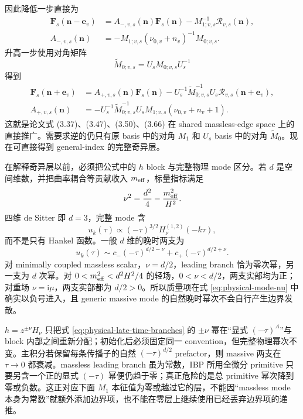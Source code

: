 \documentclass[11pt,a4paper]{ctexart}
\newcommand{\ii}{\mathrm i}
\newcommand{\cR}{\mathcal R}
\begin{document}
因此降低一步直接为
\begin{align}
 \bm F_s(\bm n-\bm e_v)
 &=A_{-,v,s}(\bm n)\bm F_s(\bm n)
 -M_{1;v,s}^{-1}\cR_{v,s}(\bm n),\\
 A_{-,v,s}(\bm n)
 &=-M_{1;v,s}(\nu_{0,v}+n_v)^{-1}M_{0;v,s}.
 \label{eq:global-Aminus}
\end{align}
升高一步使用对角矩阵
\begin{equation}
 \widetilde M_{0;v,s}=U_sM_{0;v,s}U_s^{-1}
\end{equation}
得到
\begin{align}
 \bm F_s(\bm n+\bm e_v)
 &=A_{+,v,s}(\bm n)\bm F_s(\bm n)
 -U_s^{-1}\widetilde M_{0;v,s}^{-1}U_s
 \cR_{v,s}(\bm n+\bm e_v),\\
 A_{+,v,s}(\bm n)
 &=-U_s^{-1}\widetilde M_{0;v,s}^{-1}U_s
 M_{1;v,s}(\nu_{0,v}+n_v+1).
 \label{eq:global-Aplus}
\end{align}
这就是论文式 (3.37)、(3.47)、(3.50)、(3.66) 在 shared massless-edge space 上的直接推广。需要求逆的仍只有原 basis 中的对角 $M_1$ 和 $U_s$ basis 中的对角 $\widetilde M_0$。现在可直接得到 general-index 的完整奇异层。

在解释奇异层以前，必须把公式中的 $h$ block 与完整物理 mode 区分。若 $d$ 是空间维数，并把曲率耦合等贡献收入 $m_{\rm eff}$，标量指标满足
\begin{equation}
 \nu^2=\frac{d^2}{4}-\frac{m_{\rm eff}^2}{H^2}.
 \label{eq:physical-mode-nu}
\end{equation}
四维 de Sitter 即 $d=3$，完整 mode 含
\begin{equation}
 u_k(\tau)\propto(-\tau)^{3/2}H_\nu^{(1,2)}(-k\tau),
 \label{eq:physical-mode-full-power}
\end{equation}
而不是只有 Hankel 函数。一般 $d$ 维的晚时两支为
\begin{equation}
 u_k(\tau)\sim c_-(-\tau)^{d/2-\nu}
 +c_+(-\tau)^{d/2+\nu}.
 \label{eq:physical-late-time-branches}
\end{equation}
对 minimally coupled massless scalar，$\nu=d/2$，leading branch 恰为零次幂，另一支为 $d$ 次幂。对 $0<m_{\rm eff}^2<d^2H^2/4$ 的轻场，$0<\nu<d/2$，两支实部均为正；对重场 $\nu=\ii\mu$，两支实部都为 $d/2>0$。所以质量项在式 \eqref{eq:physical-mode-nu} 中确实以负号进入，且 generic massive mode 的自然晚时幂次不会自行产生边界发散。

$h=z^{\pm\nu}H_\nu$ 只把式 \eqref{eq:physical-late-time-branches} 的 $\pm\nu$ 幂在“显式 $(-\tau)^A$”与 block 内部之间重新分配；初始化后必须固定同一 convention，但完整物理幂次不变。主积分若保留每条传播子的自然 $(-\tau)^{d/2}$ prefactor，则 massive 两支在 $\tau\to0$ 都衰减。massless leading branch 虽为常数，IBP 所用全微分 primitive 只要另含一个正的显式 $(-\tau)$ 幂便仍趋于零；真正危险的是总 primitive 幂次降到零或负数。这正对应下面 $M_1$ 本征值为零或越过它的层，不能因“massless mode 本身为常数”就额外添加边界项，也不能在零层上继续使用已经丢弃边界项的递推。
\end{document}
